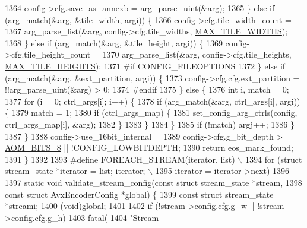 \begin{DoxyCodeInclude}
{{{{{{{{{{{{{{{{{{{1364       config->cfg.save\_as\_annexb = arg\_parse\_uint(&arg);
1365     \} \textcolor{keywordflow}{else} \textcolor{keywordflow}{if} (arg\_match(&arg, &tile\_width, argi)) \{
1366       config->cfg.tile\_width\_count =
1367           arg\_parse\_list(&arg, config->cfg.tile\_widths, \hyperlink{aom__encoder_8h_a3ec4904ea175471a03d10705f384d07c}{MAX\_TILE\_WIDTHS});
1368     \} \textcolor{keywordflow}{else} \textcolor{keywordflow}{if} (arg\_match(&arg, &tile\_height, argi)) \{
1369       config->cfg.tile\_height\_count =
1370           arg\_parse\_list(&arg, config->cfg.tile\_heights, \hyperlink{aom__encoder_8h_a446aae868ff07f3971d9e84b6602a890}{MAX\_TILE\_HEIGHTS});
1371 \textcolor{preprocessor}{#if CONFIG\_FILEOPTIONS}
1372     \} \textcolor{keywordflow}{else} \textcolor{keywordflow}{if} (arg\_match(&arg, &ext\_partition, argi)) \{
1373       config->cfg.cfg.ext\_partition = !!arg\_parse\_uint(&arg) > 0;
1374 \textcolor{preprocessor}{#endif}
1375     \} \textcolor{keywordflow}{else} \{
1376       \textcolor{keywordtype}{int} i, match = 0;
1377       \textcolor{keywordflow}{for} (i = 0; ctrl\_args[i]; i++) \{
1378         \textcolor{keywordflow}{if} (arg\_match(&arg, ctrl\_args[i], argi)) \{
1379           match = 1;
1380           \textcolor{keywordflow}{if} (ctrl\_args\_map) \{
1381             set\_config\_arg\_ctrls(config, ctrl\_args\_map[i], &arg);
1382           \}
1383         \}
1384       \}
1385       \textcolor{keywordflow}{if} (!match) argj++;
1386     \}
1387   \}
1388   config->use\_16bit\_internal =
1389       config->cfg.g\_bit\_depth > \hyperlink{group__codec_gga6ed0e98eba4651c1ad845e39498e4153a4c7f55539160206a3fbb2a6cfc9ef89c}{AOM\_BITS\_8} || !CONFIG\_LOWBITDEPTH;
1390   \textcolor{keywordflow}{return} eos\_mark\_found;
1391 \}
1392 
1393 \textcolor{preprocessor}{#define FOREACH\_STREAM(iterator, list)                 \(\backslash\)}
1394 \textcolor{preprocessor}{    for (struct stream\_state *iterator = list; iterator; \(\backslash\)}
1395 \textcolor{preprocessor}{    iterator = iterator->next)}
1396 
1397 \textcolor{keyword}{static} \textcolor{keywordtype}{void} validate\_stream\_config(\textcolor{keyword}{const} \textcolor{keyword}{struct} stream\_state *stream,
1398     \textcolor{keyword}{const} \textcolor{keyword}{struct} AvxEncoderConfig *global) \{
1399   \textcolor{keyword}{const} \textcolor{keyword}{struct }stream\_state *streami;
1400   (void)global;
1401 
1402   \textcolor{keywordflow}{if} (!stream->config.cfg.g\_w || !stream->config.cfg.g\_h)
1403     fatal(
1404         \textcolor{stringliteral}{"Stream %
}}}}}}}}}}}}}}}}}}}}
\end{DoxyCodeInclude}
